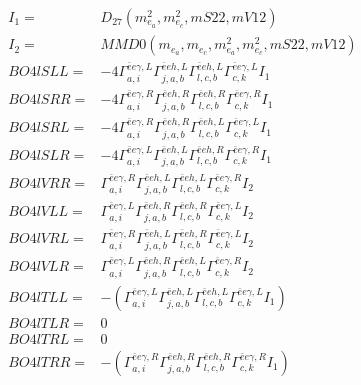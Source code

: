 \documentclass[A4,landscape]{article}
\begin{document}
\begin{align} 
I_1 = & D_{27}(m^2_{e_{{a}}}, m^2_{e_{{c}}}, mS22, mV12) \\ 
I_2 = & MMD0(m_{e_{{a}}}, m_{e_{{c}}}, m^2_{e_{{a}}}, m^2_{e_{{c}}}, mS22, mV12) \\ 
  BO4lSLL= & -4  \Gamma^{\bar{e}e \gamma ,L}_{a, i} \Gamma^{\bar{e}e h ,L}_{j, a, b} \Gamma^{\bar{e}e h ,L}_{l, c, b} \Gamma^{\bar{e}e \gamma ,L}_{c, k} I_1 \\ 
  BO4lSRR= & -4  \Gamma^{\bar{e}e \gamma ,R}_{a, i} \Gamma^{\bar{e}e h ,R}_{j, a, b} \Gamma^{\bar{e}e h ,R}_{l, c, b} \Gamma^{\bar{e}e \gamma ,R}_{c, k} I_1 \\ 
  BO4lSRL= & -4  \Gamma^{\bar{e}e \gamma ,R}_{a, i} \Gamma^{\bar{e}e h ,R}_{j, a, b} \Gamma^{\bar{e}e h ,L}_{l, c, b} \Gamma^{\bar{e}e \gamma ,L}_{c, k} I_1 \\ 
  BO4lSLR= & -4  \Gamma^{\bar{e}e \gamma ,L}_{a, i} \Gamma^{\bar{e}e h ,L}_{j, a, b} \Gamma^{\bar{e}e h ,R}_{l, c, b} \Gamma^{\bar{e}e \gamma ,R}_{c, k} I_1 \\ 
  BO4lVRR= &  \Gamma^{\bar{e}e \gamma ,R}_{a, i} \Gamma^{\bar{e}e h ,L}_{j, a, b} \Gamma^{\bar{e}e h ,L}_{l, c, b} \Gamma^{\bar{e}e \gamma ,R}_{c, k} I_2 \\ 
  BO4lVLL= &  \Gamma^{\bar{e}e \gamma ,L}_{a, i} \Gamma^{\bar{e}e h ,R}_{j, a, b} \Gamma^{\bar{e}e h ,R}_{l, c, b} \Gamma^{\bar{e}e \gamma ,L}_{c, k} I_2 \\ 
  BO4lVRL= &  \Gamma^{\bar{e}e \gamma ,R}_{a, i} \Gamma^{\bar{e}e h ,L}_{j, a, b} \Gamma^{\bar{e}e h ,R}_{l, c, b} \Gamma^{\bar{e}e \gamma ,L}_{c, k} I_2 \\ 
  BO4lVLR= &  \Gamma^{\bar{e}e \gamma ,L}_{a, i} \Gamma^{\bar{e}e h ,R}_{j, a, b} \Gamma^{\bar{e}e h ,L}_{l, c, b} \Gamma^{\bar{e}e \gamma ,R}_{c, k} I_2 \\ 
  BO4lTLL= & -( \Gamma^{\bar{e}e \gamma ,L}_{a, i} \Gamma^{\bar{e}e h ,L}_{j, a, b} \Gamma^{\bar{e}e h ,L}_{l, c, b} \Gamma^{\bar{e}e \gamma ,L}_{c, k} I_1) \\ 
  BO4lTLR= & 0 \\ 
  BO4lTRL= & 0 \\ 
  BO4lTRR= & -( \Gamma^{\bar{e}e \gamma ,R}_{a, i} \Gamma^{\bar{e}e h ,R}_{j, a, b} \Gamma^{\bar{e}e h ,R}_{l, c, b} \Gamma^{\bar{e}e \gamma ,R}_{c, k} I_1) \\ 
\end{align} 
\end{document}
